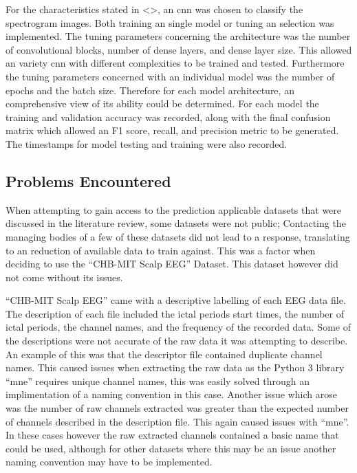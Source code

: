 \documentclass[12pt]{article}
\begin{document}
For the characteristics stated in <>, an \acrshort{cnn} was chosen to classify the spectrogram images. Both training an single model or tuning an selection was implemented. The tuning parameters concerning the architecture was the number of convolutional blocks, number of dense layers, and dense layer size. This allowed an variety \acrshort{cnn} with different complexities to be trained and tested.  Furthermore the tuning parameters concerned with an individual model was the number of epochs and the batch size. Therefore for each model architecture, an comprehensive view of its ability could be determined. For each model the training and validation accuracy was recorded, along with the final confusion matrix which allowed an F1 score, recall, and precision metric to be generated. The timestamps for model testing and training were also recorded. 



\subsection{Problems Encountered}

When attempting to gain access to the prediction applicable datasets that were discussed in the literature review, some datasets were not public; Contacting the managing bodies of a few of these datasets did not lead to a response, translating to an reduction of available data to train against. This was a factor when deciding to use the ``CHB-MIT Scalp EEG'' Dataset. This dataset however did not come without its issues.

``CHB-MIT Scalp EEG'' came with a descriptive labelling of each EEG data file. The description of each file included the ictal periods start times, the number of ictal periods, the channel names, and the frequency of the recorded data. Some of the descriptions were not accurate of the raw data it was attempting to describe. An example of this was that the descriptor file contained duplicate channel names. This caused issues when extracting the raw data as the Python 3 library ``mne'' requires unique channel names,  this was easily solved through an implimentation of a naming convention in this case. Another issue which arose was the number of raw channels extracted was greater than the expected number of channels described in the description file. This again caused issues with ``mne''. In these cases however the raw extracted channels contained a basic name that could be used, although for other datasets where this may be an issue another naming convention may have to be implemented. 
\end{document}
